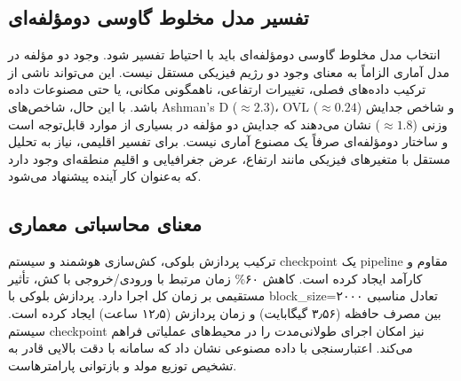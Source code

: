 \documentclass[12pt,a4paper,twocolumn]{article}
\begin{document}
\subsection{تفسیر مدل مخلوط گاوسی دومؤلفه‌ای}
انتخاب مدل مخلوط گاوسی دومؤلفه‌ای باید با احتیاط تفسیر شود. وجود دو مؤلفه در مدل آماری الزاماً به معنای وجود دو رژیم فیزیکی مستقل نیست. این می‌تواند ناشی از ترکیب داده‌های فصلی، تغییرات ارتفاعی، ناهمگونی مکانی، یا حتی مصنوعات داده باشد. با این حال، شاخص‌های Ashman's D ($\approx 2.3$)، OVL ($\approx 0.24$) و شاخص جدایش وزنی ($\approx 1.8$) نشان می‌دهند که جدایش دو مؤلفه در بسیاری از موارد قابل‌توجه است و ساختار دومؤلفه‌ای صرفاً یک مصنوع آماری نیست. برای تفسیر اقلیمی، نیاز به تحلیل مستقل با متغیرهای فیزیکی مانند ارتفاع، عرض جغرافیایی و اقلیم منطقه‌ای وجود دارد که به‌عنوان کار آینده پیشنهاد می‌شود.

\subsection{معنای محاسباتی معماری}
ترکیب پردازش بلوکی، کش‌سازی هوشمند و سیستم checkpoint یک pipeline مقاوم و کارآمد ایجاد کرده است. کاهش ۶۰\% زمان مرتبط با ورودی/خروجی با کش، تأثیر مستقیمی بر زمان کل اجرا دارد. پردازش بلوکی با block\_size=۲۰۰۰ تعادل مناسبی بین مصرف حافظه (۳٫۵۶ گیگابایت) و زمان پردازش (۱۲٫۵ ساعت) ایجاد کرده است. سیستم checkpoint نیز امکان اجرای طولانی‌مدت را در محیط‌های عملیاتی فراهم می‌کند. اعتبارسنجی با داده مصنوعی نشان داد که سامانه با دقت بالایی قادر به تشخیص توزیع مولد و بازتوانی پارامترهاست.
\end{document}
